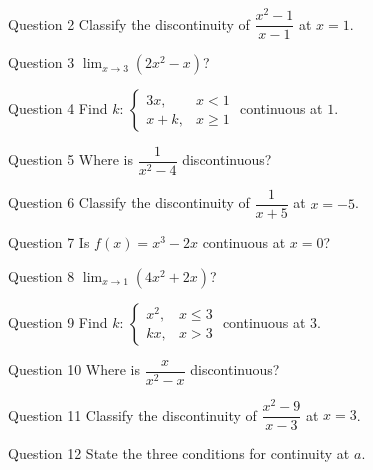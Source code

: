 \documentclass[11pt]{article}
\begin{document}
\begin{qbox}{Question 2}
Classify the discontinuity of $\dfrac{x^2-1}{x-1}$ at $x=1$.\workspace{2.4cm}
\end{qbox}

\begin{qbox}{Question 3}
$\displaystyle\lim_{x\to3}(2x^2-x)$?\workspace{2.4cm}
\end{qbox}

\begin{qbox}{Question 4}
Find $k$: $\begin{cases}3x,&x<1\\x+k,&x\ge1\end{cases}$ continuous at $1$.\workspace{2.4cm}
\end{qbox}

\begin{qbox}{Question 5}
Where is $\dfrac1{x^2-4}$ discontinuous?\workspace{2.4cm}
\end{qbox}

\begin{qbox}{Question 6}
Classify the discontinuity of $\dfrac1{x+5}$ at $x=-5$.\workspace{2.4cm}
\end{qbox}

\begin{qbox}{Question 7}
Is $f(x)=x^3-2x$ continuous at $x=0$?\workspace{2.4cm}
\end{qbox}

\begin{qbox}{Question 8}
$\displaystyle\lim_{x\to1}(4x^2+2x)$?\workspace{2.4cm}
\end{qbox}

\begin{qbox}{Question 9}
Find $k$: $\begin{cases}x^2,&x\le3\\kx,&x>3\end{cases}$ continuous at $3$.\workspace{2.4cm}
\end{qbox}

\begin{qbox}{Question 10}
Where is $\dfrac{x}{x^2-x}$ discontinuous?\workspace{2.4cm}
\end{qbox}

\begin{qbox}{Question 11}
Classify the discontinuity of $\dfrac{x^2-9}{x-3}$ at $x=3$.\workspace{2.4cm}
\end{qbox}

\begin{qbox}{Question 12}
State the three conditions for continuity at $a$.\workspace{2.4cm}
\end{qbox}
\end{document}
